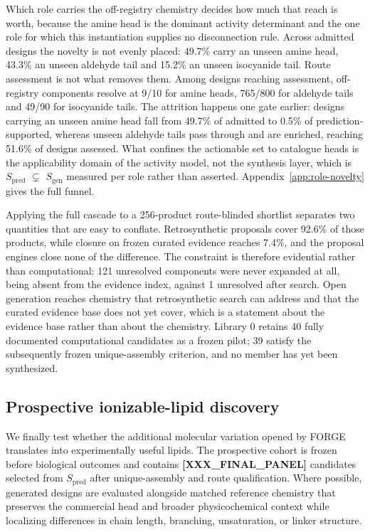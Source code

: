 \documentclass{article}
\newcounter{none}
\newcommand{\PENDING}[1]{\textbf{[#1]}}
\newcommand{\OffAmineAdm}{49.7\%}
\newcommand{\OffAldAdm}{43.3\%}
\newcommand{\OffIsoAdm}{15.2\%}
\newcommand{\OffAmineSup}{0.5\%}
\newcommand{\OffAldAssessed}{51.6\%}
\newcommand{\ResolveOffAmine}{9/10}
\newcommand{\ResolveOffAld}{765/800}
\newcommand{\ResolveOffIso}{49/90}
\newcommand{\ShortlistN}{256}                 %
\newcommand{\ProposalCoverage}{92.6\%}        %
\newcommand{\AdjudicatedClosure}{7.4\%}       %
\newcommand{\NeverExpanded}{121}              %
\newcommand{\AfterSearch}{1}                  %
\newcommand{\LibraryZeroN}{40}
\newcommand{\LibraryZeroUnique}{39}
\newcommand{\FinalPanel}{\PENDING{XXX\_FINAL\_PANEL}}
\newcommand{\Sgen}{\ensuremath{S_{\mathrm{gen}}}}
\newcommand{\Spred}{\ensuremath{S_{\mathrm{pred}}}}
\begin{document}
Which role carries the off-registry chemistry decides how much that reach is worth, because the amine
head is the dominant activity determinant and the one role for which this instantiation supplies no
disconnection rule. Across admitted designs the novelty is not evenly placed: \OffAmineAdm{} carry an
unseen amine head, \OffAldAdm{} an unseen aldehyde tail and \OffIsoAdm{} an unseen isocyanide tail.
Route assessment is not what removes them. Among designs reaching assessment, off-registry components
resolve at \ResolveOffAmine{} for amine heads, \ResolveOffAld{} for aldehyde tails and
\ResolveOffIso{} for isocyanide tails. The attrition happens one gate earlier: designs carrying an
unseen amine head fall from \OffAmineAdm{} of admitted to \OffAmineSup{} of prediction-supported,
whereas unseen aldehyde tails pass through and are enriched, reaching \OffAldAssessed{} of designs
assessed. What confines the actionable set to catalogue heads is the applicability domain of the
activity model, not the synthesis layer, which is \Spred{} $\subsetneq$ \Sgen{} measured per role
rather than asserted. Appendix~\ref{app:role-novelty} gives the full funnel.

Applying the full cascade to a \ShortlistN{}-product route-blinded shortlist separates two quantities
that are easy to conflate. Retrosynthetic proposals cover \ProposalCoverage{} of those
products, while closure on frozen curated evidence reaches \AdjudicatedClosure{}, and the
proposal engines close none of the difference. The constraint is therefore evidential rather than
computational: \NeverExpanded{} unresolved components were never expanded at all, being absent from the
evidence index, against \AfterSearch{} unresolved after search. Open generation reaches chemistry that
retrosynthetic search can address and that the curated evidence base does not yet cover, which is a
statement about the evidence base rather than about the chemistry. Library 0 retains \LibraryZeroN{} fully documented computational candidates as a
frozen pilot; \LibraryZeroUnique{} satisfy the subsequently frozen unique-assembly criterion, and no
member has yet been synthesized.

\subsection{Prospective ionizable-lipid discovery}
\label{sec:prospective}
We finally test whether the additional molecular variation opened by FORGE translates into
experimentally useful lipids. The prospective cohort is frozen before biological outcomes and
contains \FinalPanel{} candidates selected from \Spred{} after unique-assembly and route
qualification. Where possible, generated designs are evaluated alongside matched reference chemistry
that preserves the commercial head and broader physicochemical context while localizing differences in
chain length, branching, unsaturation, or linker structure.
\end{document}
